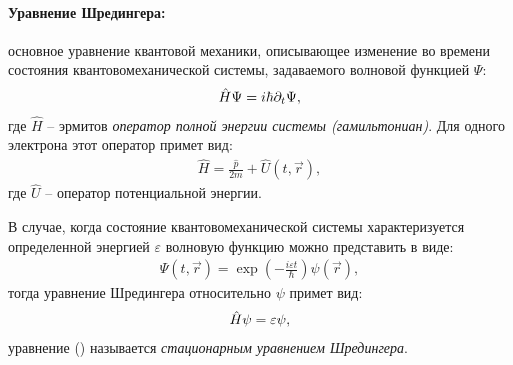 \documentclass[__minimum__.tex]{subfiles}
\begin{document}
\paragraph{Уравнение Шредингера:} основное уравнение квантовой механики, описывающее изменение во времени состояния квантовомеханической системы, задаваемого волновой функцией $\Psi$:
\begin{gather}
  \hat{H}\Psi=i\hbar\partial_{t}\Psi,
  \llabel{k:shred}
\end{gather}
где $\hat{H}$ -- эрмитов \emph{оператор полной энергии системы (гамильтониан)}. Для одного электрона этот оператор примет вид:
\begin{gather}
  \hat{H}=\frac{\hat{p}}{2m}+\hat{U}(t,\vec{r}),
\end{gather}
где $\hat{U}$ -- оператор потенциальной энергии.

В случае, когда состояние квантовомеханической системы характеризуется определенной энергией $\varepsilon$ волновую функцию можно представить в виде:
\begin{gather}
  \Psi(t,\vec{r})=\exp\left(-\frac{i\varepsilon{t}}{\hbar}\right)\psi(\vec{r}),
\end{gather}
тогда уравнение Шредингера относительно $\psi$ примет вид:
\begin{gather}
  \hat{H}\psi=\varepsilon\psi,
  \llabel{k:stat-sh}
\end{gather}
уравнение () называется \emph{стационарным уравнением Шредингера}.
\end{document}

